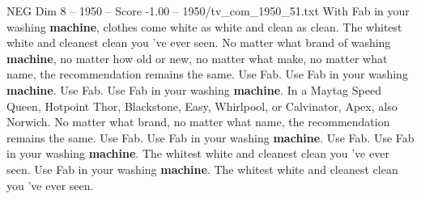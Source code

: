 \begin{textsample}{NEG Dim 8 – 1950 – Score -1.00 – 1950/tv\_com\_1950\_51.txt}  \label{ex:f8_neg_090}
With Fab in your washing \textbf{machine}, clothes come white as white and clean as clean.
The whitest white and cleanest clean you 've ever seen.
No matter what brand of washing \textbf{machine}, no matter how old or new, no matter what make, no matter what name, the recommendation remains the same.
Use Fab.
Use Fab in your washing \textbf{machine}.
Use Fab.
Use Fab in your washing \textbf{machine}.
In a Maytag Speed Queen, Hotpoint Thor, Blackstone, Easy, Whirlpool, or Calvinator, Apex, also Norwich.
No matter what brand, no matter what name, the recommendation remains the same.
Use Fab.
Use Fab in your washing \textbf{machine}.
Use Fab.
Use Fab in your washing \textbf{machine}.
The whitest white and cleanest clean you 've ever seen.
Use Fab in your washing \textbf{machine}.
The whitest white and cleanest clean you 've ever seen.

\end{textsample}
